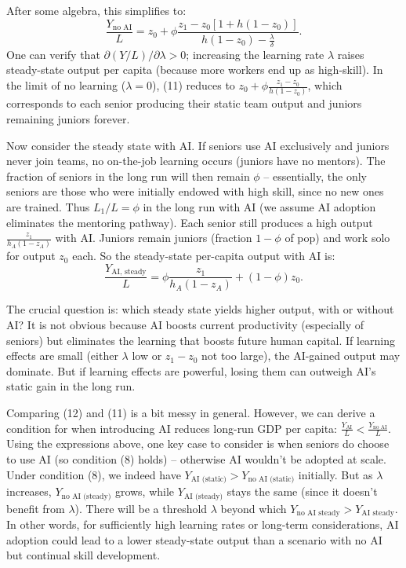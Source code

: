 \documentclass[12pt]{article}
\begin{document}
After some algebra, this simplifies to: 
\begin{equation}
\frac{Y_{\text{no AI}}}{L} =
z_0 +
\phi \frac{z_1 - z_0[1 + h (1-z_0)]}{h(1-z_0) - \frac{\lambda}{\delta}}.
\tag{11}
\end{equation}
One can verify that \(\partial (Y/L)/\partial \lambda > 0\);
increasing the learning rate \(\lambda\) raises steady-state output per
capita (because more workers end up as high-skill). In the limit of no
learning (\(\lambda=0\)), (11) reduces to
\(z_0 + \phi\frac{z_1 - z_0}{h(1-z_0)}\), which corresponds to each
senior producing their static team output and juniors remaining juniors
forever.

Now consider the steady state {with AI}. If seniors use AI
exclusively and juniors never join teams, {no on-the-job learning
occurs} (juniors have no mentors). The fraction of seniors in the long
run will then remain \(\phi\) -- essentially, the only seniors are those
who were initially endowed with high skill, since no new ones are
trained. Thus \(L_1/L = \phi\) in the long run with AI (we assume AI
adoption eliminates the mentoring pathway). Each senior still produces a
high output \(\frac{z_1}{h_A(1-z_A)}\) with AI. Juniors remain juniors
(fraction \(1-\phi\) of pop) and work solo for output \(z_0\) each. So
the {steady-state per-capita output with AI} is: 
\begin{equation}
\frac{Y_{\text{AI, steady}}}{L} = \phi \frac{z_1}{h_A(1-z_A)} +
(1-\phi) z_0. \tag{12}
\end{equation}

The crucial question is: {which steady state yields higher output,
with or without AI?} It is not obvious because {AI boosts current
productivity} (especially of seniors) but {eliminates the
learning that boosts future human capital}. If learning effects are
small (either \(\lambda\) low or \(z_1 - z_0\) not too large), the
AI-gained output may dominate. But if learning effects are powerful,
losing them can outweigh AI's static gain in the long run.

Comparing (12) and (11) is a bit messy in general. However, we can
derive a condition for when introducing AI {reduces long-run GDP
per capita}: \(\frac{Y_{\text{AI}}}{L} < \frac{Y_{\text{no AI}}}{L}.\)
Using the expressions above, one key case to consider is when seniors
{do} choose to use AI (so condition (8) holds) -- otherwise AI
wouldn't be adopted at scale. Under condition (8), we indeed have
\(Y_{\text{AI (static)}} > Y_{\text{no AI (static)}}\) initially. But as
\(\lambda\) increases, \(Y_{\text{no AI (steady)}}\) grows, while
\(Y_{\text{AI (steady)}}\) stays the same (since it doesn't benefit from
\(\lambda\)). There will be a threshold \(\lambda\) beyond which
\(Y_{\text{no AI steady}} > Y_{\text{AI steady}}\). In other words,
{for sufficiently high learning rates or long-term
considerations, AI adoption could lead to a lower steady-state output}
than a scenario with no AI but continual skill development.
\end{document}
